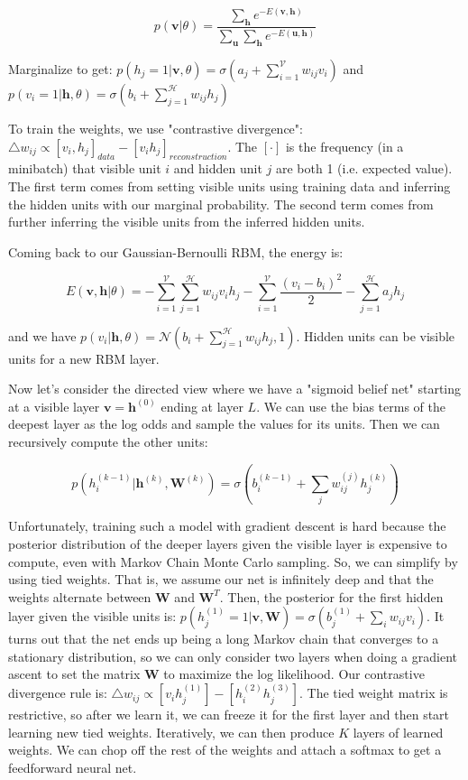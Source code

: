 \documentclass[a4paper]{article}
\begin{document}
$$
p(\mathbf{v} | \theta) = \frac{
\sum_{\mathbf{h}}{e^{- E(\mathbf{v}, \mathbf{h})}}}{
\sum_{\mathbf{u}}{\sum_{\mathbf{h}}{e^{- E(\mathbf{u}, \mathbf{h})}}}
}
$$

Marginalize to get: $
p(h_j = 1 | \mathbf{v}, \theta) = \sigma(a_j + \sum_{i=1}^{\mathcal{V}}{
w_{ij} v_{i}
})
$ and $
p(v_i = 1 | \mathbf{h}, \theta) = \sigma(b_i + \sum_{j=1}^{\mathcal{H}}{
w_{ij} h_{j}
})
$

To train the weights, we use "contrastive divergence": $\triangle w_{ij}
\propto [v_i, h_j]_{data} - [v_i h_j]_{reconstruction}$. The $[\cdot]$ is the
frequency (in a minibatch) that visible unit $i$ and hidden unit $j$ are both
1 (i.e. expected value). The first term comes from setting visible units using
training data and inferring the hidden units with our marginal probability. The
second term comes from further inferring the visible units from the inferred
hidden units.

Coming back to our Gaussian-Bernoulli RBM, the energy is:

$$
E(\mathbf{v}, \mathbf{h} | \theta) = - \sum_{i=1}^{\mathcal{V}}{
\sum_{j=1}^{\mathcal{H}}{w_{ij} v_i h_j}} - \sum_{i=1}^{\mathcal{V}}{\frac{
(v_i - b_i)^2
}{2}}
- \sum_{j=1}^{\mathcal{H}}{a_j h_j}
$$

and we have $p(v_i | \mathbf{h}, \theta) = \mathcal{N}(
b_i + \sum_{j=1}^{\mathcal{H}}{w_{ij} h_j},
1
)$. Hidden units can be visible units for a new RBM layer.

Now let's consider the directed view where we have a "sigmoid belief net"
starting at a visible layer $\mathbf{v} = \mathbf{h}^{(0)}$ ending at layer $L$.
We can use the bias terms of the deepest layer as the log odds and sample
the values for its units. Then we can recursively compute the other units:

$$
p(h_i^{(k-1)} | \mathbf{h}^{(k)}, \mathbf{W}^{(k)}) =
\sigma(b_i^{(k-1)} + \sum_{j}{w_{ij}^{(j)} h_j^{(k)}})
$$

Unfortunately, training such a model with gradient descent is hard because
the posterior distribution of the deeper layers given the visible layer
is expensive to compute, even with Markov Chain Monte Carlo sampling. So,
we can simplify by using tied weights. That is, we assume our net is infinitely
deep and that the weights alternate between $\mathbf{W}$ and $\mathbf{W}^T$.
Then, the posterior for the first hidden layer given the visible units is: $
p(h_j^{(1)} = 1 | \mathbf{v}, \mathbf{W}) = \sigma(b_j^{(1)} + \sum_{i}{
w_{ij} v_i})$. It turns out that the net ends up being a long Markov chain
that converges to a stationary distribution, so we can only consider two layers
when doing a gradient ascent to set the matrix $\mathbf{W}$ to maximize the
log likelihood. Our contrastive divergence rule is: $\triangle w_{ij} \propto
[v_i h_j^{(1)}] - [h_i^{(2)} h_j^{(3)}]$. The tied weight matrix is restrictive,
so after we learn it, we can freeze it for the first layer and then start
learning new tied weights. Iteratively, we can then produce $K$ layers of
learned weights. We can chop off the rest of the weights and attach a softmax
to get a feedforward neural net.
\end{document}
